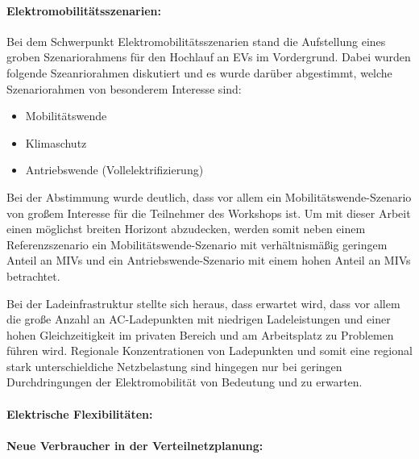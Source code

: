 \paragraph{Elektromobilitätsszenarien:}


Bei dem Schwerpunkt \glqq Elektromobilitätsszenarien\grqq{} stand die Aufstellung eines groben Szenariorahmens für den Hochlauf an \glspl{EV} im Vordergrund.
Dabei wurden folgende Szeanriorahmen diskutiert und es wurde darüber abgestimmt, welche Szenariorahmen von besonderem Interesse sind:

\begin{itemize}
    \item Mobilitätswende
    \item Klimaschutz
    \item Antriebswende (Vollelektrifizierung)
\end{itemize}

Bei der Abstimmung wurde deutlich, dass vor allem ein Mobilitätswende-Szenario von großem Interesse für die Teilnehmer des Workshops ist.
Um mit dieser Arbeit einen möglichst breiten Horizont abzudecken, werden somit neben einem Referenzszenario ein Mobilitätswende-Szenario mit verhältnismäßig geringem Anteil an \glspl{MIV} und ein Antriebswende-Szenario mit einem hohen Anteil an \glspl{MIV} betrachtet.\medskip

Bei der Ladeinfrastruktur stellte sich heraus, dass erwartet wird, dass vor allem die große Anzahl an \gls{AC}-Ladepunkten mit niedrigen Ladeleistungen und einer hohen Gleichzeitigkeit im privaten Bereich und am Arbeitsplatz zu Problemen führen wird.
Regionale Konzentrationen von Ladepunkten und somit eine regional stark unterschieldiche Netzbelastung sind hingegen nur bei geringen Durchdringungen der Elektromobilität von Bedeutung und zu erwarten.

\paragraph{Elektrische Flexibilitäten:}


\paragraph{Neue Verbraucher in der Verteilnetzplanung:}

